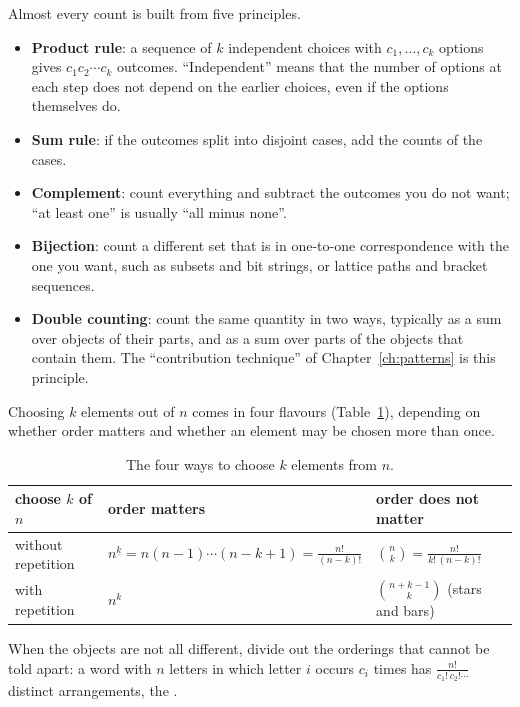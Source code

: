 Almost every count is built from five principles.
\begin{itemize}
  \item \textbf{Product rule}: a sequence of $k$ independent choices with $c_1, \dots, c_k$ options gives $c_1 c_2 \cdots c_k$ outcomes.
        ``Independent'' means that the number of options at each step does not depend on the earlier choices, even if the options
        themselves do.
  \item \textbf{Sum rule}: if the outcomes split into disjoint cases, add the counts of the cases.
  \item \textbf{Complement}: count everything and subtract the outcomes you do not want; ``at least one'' is usually ``all minus none''.
  \item \textbf{Bijection}: count a different set that is in one-to-one correspondence with the one you want, such as subsets and
        bit strings, or lattice paths and bracket sequences.
  \item \textbf{Double counting}: count the same quantity in two ways, typically as a sum over objects of their parts, and as a sum
        over parts of the objects that contain them. The ``contribution technique'' of Chapter~\ref{ch:patterns} is this principle.
\end{itemize}

Choosing $k$ elements out of $n$ comes in four flavours (Table~\ref{tab:selections}), depending on whether order matters and whether
an element may be chosen more than once.

\begin{table}[htbp]
\centering\small
\begin{tabular}{@{}lll@{}}
\toprule
choose $k$ of $n$ & order matters & order does not matter \\
\midrule
without repetition & $n^{\underline{k}} = n (n-1) \cdots (n - k + 1) = \frac{n!}{(n-k)!}$ & $\binom{n}{k} = \frac{n!}{k!\,(n-k)!}$ \\[2pt]
with repetition & $n^k$ & $\binom{n + k - 1}{k}$ (stars and bars) \\
\bottomrule
\end{tabular}
\caption{The four ways to choose $k$ elements from $n$.}
\label{tab:selections}
\end{table}

When the objects are not all different, divide out the orderings that cannot be told apart: a word with $n$ letters in which letter $i$
occurs $c_i$ times has $\frac{n!}{c_1!\, c_2! \cdots}$ distinct arrangements, the .

